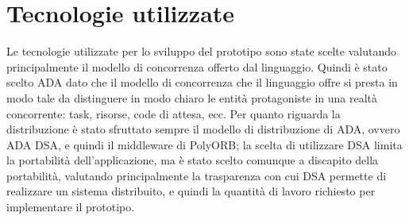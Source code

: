 \section{Tecnologie utilizzate}
Le tecnologie utilizzate per lo sviluppo del prototipo sono state scelte valutando principalmente il modello di concorrenza offerto dal linguaggio. Quindi è stato scelto ADA dato che il modello di concorrenza che il linguaggio offre si presta in modo tale da distinguere in modo chiaro le entità protagoniste in una realtà concorrente: task, risorse, code di attesa, ecc. Per quanto riguarda la distribuzione è stato sfruttato sempre il modello di distribuzione di ADA, ovvero ADA DSA, e quindi il middleware di PolyORB; la scelta di utilizzare DSA limita la portabilità dell'applicazione, ma è stato scelto comunque a discapito della portabilità, valutando principalmente la trasparenza con cui DSA permette di realizzare un sistema distribuito, e quindi la quantità di lavoro richiesto per implementare il prototipo.